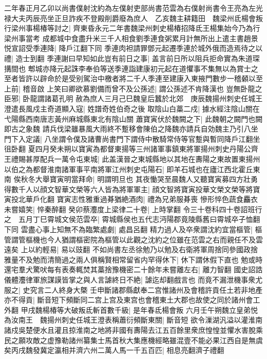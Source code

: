 二年春正月乙卯以尚書僕射沈約為左僕射吏部尚書范雲為右僕射尚書令王亮為左光禄大夫丙辰亮坐正旦詐疾不登殿削爵廢為庶人　乙亥魏主耕籍田　魏梁州氐楊會叛行梁州事楊椿等討之|{
	齊東昏永元二年書魏梁州刺史楊椿招降氐王楊集始今乃為行梁州事當考}
成都城中食盡升米三千人相食劉季連食粥累月計無所出上遣主書趙景悦宣詔受季連降|{
	降戶江翻下同}
季連肉袒請罪鄧元起遷季連於城外俄而造焉待之以禮|{
	造士到翻}
季連謝曰早知如此豈有前日之事|{
	盖言前日所以阻兵拒命實為朱道琛搆間也}
郫城亦降元起誅李奉伯等送季連詣建康初元起在道懼事不集無以為賞士之至者皆許以辟命於是受别駕治中檄者將二千人季連至建康入東掖門數步一稽顙以至上前|{
	稽音啟}
上笑曰卿欲慕劉備而曾不及公孫述|{
	謂公孫述不肯降漢也}
豈無卧龍之臣邪|{
	卧龍謂諸葛孔明}
赦為庶人三月己巳魏皇后蠶於北郊　庚辰魏揚州刺史任城王澄遣長風戍主奇道顯入寇|{
	姓譜奇姓伯奇之後}
取陰山白藁二戍|{
	據水經注陰山關在弋陽縣西南唐志黃州麻城縣東北有陰山關}
蕭寶寅伏於魏闕之下|{
	此魏朝之闕門也闕即古之象魏}
請兵伐梁雖暴風大雨終不蹔移會陳伯之降魏亦請兵自効魏主乃引八坐門下入定議|{
	八坐謂令僕及諸曹尚書門下謂侍中散騎常侍等官蹔與暫同降戶江翻坐徂卧翻}
夏四月癸未朔以寶寅為都督東揚等三州諸軍事鎮東將軍揚州刺史丹陽公齊王禮賜甚厚配兵一萬令屯東城|{
	此盖漢晉之東城縣地以其地在夀陽之東故置東揚州}
以伯之為都督淮南諸軍事平南將軍江州刺史屯陽石|{
	即羊石城也在廬江西北霍丘東南}
俟秋冬大舉寶寅明當拜命|{
	明謂明旦也}
其夜慟哭至晨魏人又聽寶寅募四方壯勇得數千人以顔文智華文榮等六人皆為將軍軍主|{
	顔文智將寶寅投華文榮文榮等將寶寅投北華戶化翻}
寶寅志性雅重過朞猶絶酒肉|{
	禮為兄弟服朞喪}
慘形悴色蔬食麤衣未嘗嬉笑|{
	悴秦醉翻}
癸卯蔡灋度上梁律二十卷|{
	上時掌翻}
令三十卷科四十卷詔班行之　五月丁巳霄城文侯范雲卒|{
	霄城縣侯也五代志沔陽郡竟陵縣舊曰霄城卒子恤翻下同}
雲盡心事上知無不為臨繁處劇|{
	處昌呂翻}
精力過人及卒衆謂沈約宜當樞管|{
	樞管謂管樞機也今人猶謂樞密院為樞管以此觀之沈約之位雖在范雲之右而親任不及雲遠矣}
上以約輕易|{
	易以豉翻}
不如尚書左丞徐勉乃以勉及右衛將軍周捨同參國政捨雅量不及勉而清簡過之兩人俱稱賢相常留省内罕得休下|{
	休下謂休假下直也}
勉或時還宅羣犬驚吠每有表奏輒焚其藁捨豫機密二十餘年未嘗離左右|{
	離力智翻}
國史詔誥儀體灋律軍旅謀謨皆掌之與人言謔終日不絶|{
	謔迄却翻戲言也}
而竟不漏泄機事衆尤服之|{
	史究言二人終身大槩}
壬申斷諸郡縣獻奉二宫惟諸州及會稽許貢任土若非地產亦不得貢|{
	斷音短下頻斷同二宫上宫及東宫也會稽東土大郡也故使之同於諸州會工外翻}
甲戌魏楊椿等大破叛氐斬首數千級|{
	是年春氐楊會叛}
六月壬午朔魏立皇弟悦為汝南王　魏揚州刺史任城王澄表稱蕭衍頻斷東關|{
	斷音短}
欲令漅湖汎溢以灌淮南諸戍吳楚便水且灌且掠淮南之地將非國有夀陽去江五百餘里衆庶惶惶並懼水害脫乘民之願攻敵之虚豫勒諸州纂集士馬首秋大集應機經略雖混壹不能必果江西自是無虞矣丙戌魏發冀定瀛相并濟六州二萬人馬一千五百匹|{
	相息亮翻濟子禮翻}
